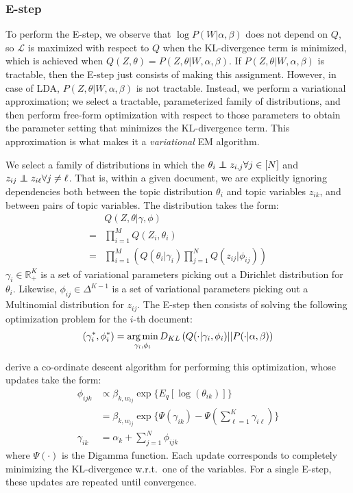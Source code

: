 \documentclass[letterpaper]{article}
\begin{document}
\subsubsection{E-step}
To perform the E-step, we observe that $\log P(W | \alpha, \beta)$ does not depend on $Q$, so $\mathcal{L}$ is maximized with respect to $Q$ when the KL-divergence term is minimized, which is achieved when $Q(Z, \theta) = P(Z, \theta | W, \alpha, \beta)$. If $P(Z, \theta | W, \alpha, \beta)$ is tractable, then the E-step just consists of making this assignment. However, in case of LDA, $P(Z, \theta | W, \alpha, \beta)$ is not tractable. Instead, we perform a variational approximation; we select a tractable, parameterized family of distributions, and then perform free-form optimization with respect to those parameters to obtain the parameter setting that minimizes the KL-divergence term. This approximation is what makes it a \textit{variational} EM algorithm.

We select a family of distributions in which the $\theta_i \independent z_{i, j} \forall j \in [N]$ and $z_{ij} \independent z_{i\ell} \forall j \neq \ell$. That is, within a given document, we are explicitly ignoring dependencies both between the topic distribution $\theta_i$ and topic variables $z_{ik}$, and between pairs of topic variables. The distribution takes the form:
\begin{align}
    &Q(Z, \theta | \gamma, \phi)\\
    = &\prod_{i=1}^M Q(Z_i, \theta_i)\\
    = &\prod_{i=1}^M \left(Q(\theta_i | \gamma_i)\prod_{j=1}^N Q(z_{ij} | \phi_{ij})\right)
\end{align}
$\gamma_i \in \mathbb{R}^K_+$ is a set of variational parameters picking out a Dirichlet distribution for $\theta_i$. Likewise, $\phi_{ij} \in \Delta^{K-1}$ is a set of variational parameters picking out a Multinomial distribution for $z_{ij}$. The E-step then consists of solving the following optimization problem for the $i$-th document:
\begin{align}
    (\gamma^*_i, \phi^*_i) = \operatorname*{arg\,min}_{\gamma_i, \phi_i} D_{KL}\left(Q(\cdot | \gamma_i, \phi_i) || P(\cdot | \alpha, \beta)\right)
\end{align}

\citet{blei2003latent} derive a co-ordinate descent algorithm for performing this optimization, whose updates take the form:
\begin{align}
    \phi_{ijk} &\propto \beta_{k, w_{ij}} \exp\{E_q[\log(\theta_{ik})]\}\\
    &= \beta_{k, w_{ij}} \exp\{\Psi(\gamma_{ik}) - \Psi(\sum_{\ell = 1}^K \gamma_{i\ell})\}\\
    \gamma_{ik} &= \alpha_k + \sum_{j=1}^N \phi_{ijk}
\end{align}
where $\Psi(\cdot)$ is the Digamma function. Each update corresponds to completely minimizing the KL-divergence w.r.t.\ one of the variables. For a single E-step, these updates are repeated until convergence.
\end{document}
